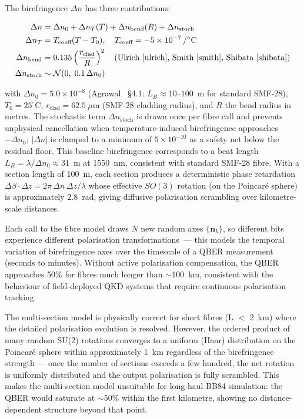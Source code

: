 \documentclass[3p,times,preprint]{elsarticle}
\begin{document}
The birefringence $\Delta n$ has three contributions:

\begin{align}
  \Delta n &= \Delta n_0 + \Delta n_T(T) + \Delta n_{\text{bend}}(R)
             + \Delta n_{\text{stoch}} \\
  \Delta n_T &= T_{\text{coeff}} (T - T_0),\quad
    T_{\text{coeff}} = -5\times10^{-7}\,/^\circ\text{C} \\
  \Delta n_{\text{bend}} &= 0.135 \left(\frac{r_{\text{clad}}}{R}\right)^2
    \quad\text{(Ulrich~\cite{ulrich}, Smith~\cite{smith},
             Shibata~\cite{shibata})} \\
  \Delta n_{\text{stoch}} &\sim \mathcal{N}(0,\; 0.1\,\Delta n_0)
\end{align}

with $\Delta n_0 = 5.0\times10^{-8}$ (Agrawal~\cite{agrawal5} \S4.1:
$L_B \approx 10$--$100$~m for standard SMF-28),
$T_0 = 25^\circ$C, $r_{\text{clad}} = 62.5~\mu$m (SMF-28 cladding radius),
and $R$ the bend radius in metres.  The stochastic term $\Delta n_{\text{stoch}}$
is drawn once per fibre call and prevents unphysical cancellation when
temperature-induced birefringence approaches $-\Delta n_0$; $|\Delta n|$ is
clamped to a minimum of $5\times10^{-10}$ as a safety net below the
residual floor.  This baseline birefringence corresponds to a beat length
$L_B = \lambda / \Delta n_0 \approx 31$~m at 1550~nm, consistent with
standard SMF-28 fibre.  With a section length of 100~m, each section
produces a deterministic phase retardation $\Delta\beta\cdot\Delta z =
2\pi\,\Delta n\,\Delta z / \lambda$ whose effective $SO(3)$ rotation
(on the Poincar\'e sphere) is approximately $2.8$~rad, giving diffusive
polarisation scrambling over kilometre-scale distances.

Each call to the fibre model draws $N$ new random axes $\{\mathbf{n}_k\}$,
so different bits experience different polarisation transformations\ ---
this models the temporal variation of birefringence axes over the
timescale of a QBER measurement (seconds to minutes).  Without active
polarisation compensation, the QBER approaches 50\% for fibres much
longer than $\sim$100~km, consistent with the behaviour of field-deployed
QKD systems that require continuous polarisation tracking.

The multi-section model is physically correct for short fibres
(L $<$ 2~km) where the detailed polarisation evolution is resolved.
However, the ordered product of many random SU(2) rotations
converges to a uniform (Haar) distribution on the Poincar\'e
sphere within approximately 1~km regardless of the birefringence
strength --- once the number of sections exceeds a few hundred,
the net rotation is uniformly distributed and the output
polarisation is fully scrambled.  This makes the multi-section
model unsuitable for long-haul BB84 simulation: the QBER would
saturate at $\sim$50\% within the first kilometre, showing no
distance-dependent structure beyond that point.
\end{document}
